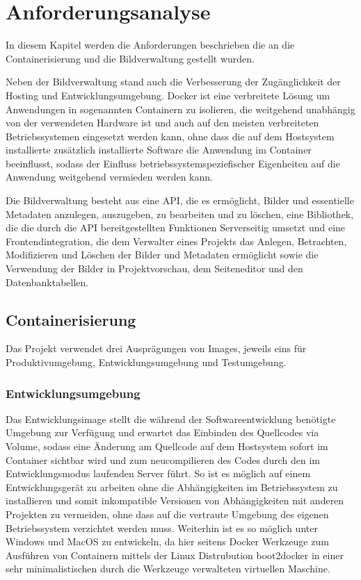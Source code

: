 \section{Anforderungsanalyse}
\label{sec:requirements}

In diesem Kapitel werden die Anforderungen beschrieben die an die
Containerisierung und die Bildverwaltung gestellt wurden.

Neben der Bildverwaltung stand auch die Verbesserung der Zugänglichkeit der
Hosting und Entwicklungsumgebung. Docker ist eine verbreitete Lösung um
Anwendungen in sogenannten Containern zu isolieren, die weitgehend
unabhängig von der verwendeten Hardware ist und auch auf den meisten
verbreiteten Betriebssystemen eingesetzt werden kann, ohne dass die auf dem
Hostsystem installierte zusätzlich installierte Software die Anwendung im
Container beeinflusst, sodass der Einfluss betriebssystemspeziefischer
Eigenheiten auf die Anwendung weitgehend vermieden werden kann.

Die Bildverwaltung besteht aus eine API, die es ermöglicht, Bilder und
essentielle Metadaten anzulegen, auszugeben, zu bearbeiten und zu löschen, eine
Bibliothek, die die durch die API bereitgestellten Funktionen Serverseitig
umsetzt und eine Frontendintegration, die dem Verwalter eines Projekts das
Anlegen, Betrachten, Modifizieren und Löschen der Bilder und Metadaten
ermöglicht sowie die Verwendung der Bilder in Projektvorschau, dem Seiteneditor
und den Datenbanktabellen.

\subsection{Containerisierung}

Das Projekt verwendet drei Ausprägungen von Images, jeweils eins für
Produktivumgebung, Entwicklungsumgebung und Testumgebung.

\subsubsection{Entwicklungsumgebung}

Das Entwicklungsimage stellt die während der Softwareentwicklung
benötigte Umgebung zur Verfügung und erwartet das Einbinden des
Quellcodes via Volume, sodass eine Änderung am Quellcode auf dem Hostsystem
sofort im Container sichtbar wird und zum neucompilieren des Codes durch den im
Entwicklungsmodus laufenden Server führt. So ist es möglich auf einem
Entwicklungsgerät zu arbeiten ohne die Abhängigkeiten im Betriebssystem
zu installieren und somit inkompatible Versionen von Abhängigkeiten mit
anderen Projekten zu vermeiden, ohne dass auf die vertraute Umgebung des eigenen
Betriebssystem verzichtet werden muss. Weiterhin ist es so möglich unter Windows
und MacOS zu entwickeln, da hier seitens Docker Werkzeuge zum Ausführen von
Containern mittels der Linux Distrubution boot2docker in einer sehr
minimalistischen durch die Werkzeuge verwalteten virtuellen Maschine.

